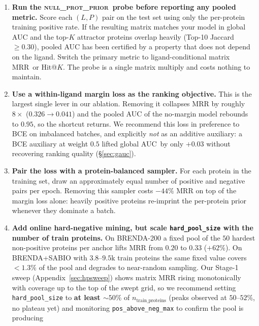 \documentclass[11pt,a4paper]{article}
\newcommand{\nullprior}{\textsc{null\_prot\_prior}\xspace}
\newcommand{\gauc}{global AUC}
\newcommand{\matmrr}{matrix MRR}
\begin{document}
\begin{enumerate}[leftmargin=*,itemsep=2pt,topsep=2pt]
  \item \textbf{Run the \nullprior\ probe before reporting any pooled
        metric.} Score each $(L, P)$ pair on the test set using only
        the per-protein training positive rate. If the resulting
        matrix matches your model in global AUC and the top-$K$
        attractor proteins overlap heavily (Top-10 Jaccard $\ge 0.30$),
        pooled AUC has been certified by a property that does not
        depend on the ligand. Switch the primary metric to
        ligand-conditional \matmrr\ or Hit@$K$. The probe is a single
        matrix multiply and costs nothing to maintain.
  \item \textbf{Use a within-ligand margin loss as the ranking
        objective.} This is the largest single lever in our ablation.
        Removing it collapses MRR by roughly $8\times$
        ($0.326 \to 0.041$) and the pooled AUC of the no-margin model
        rebounds to $0.95$, so the shortcut returns. We recommend this
        loss in preference to BCE on imbalanced batches, and
        explicitly \emph{not} as an additive auxiliary: a BCE
        auxiliary at weight $0.5$ lifted \gauc\ by only $+0.03$
        without recovering ranking quality (\S\ref{sec:gauc}).
  \item \textbf{Pair the loss with a protein-balanced sampler.} For
        each protein in the training set, draw an approximately equal
        number of positive and negative pairs per epoch. Removing this
        sampler costs $-44\%$ MRR on top of the margin loss alone:
        heavily positive proteins re-imprint the per-protein prior
        whenever they dominate a batch.
  \item \textbf{Add online hard-negative mining, but scale
        \texttt{hard\_pool\_size} with the number of train proteins.}
        On BRENDA-200 a fixed pool of the $50$ hardest non-positive
        proteins per anchor lifts MRR from $0.20$ to $0.33$
        ($+62\%$). On BRENDA+SABIO with $3.8$--$9.5$k train proteins
        the same fixed value covers $<\!1.3\%$ of the pool and
        degrades to near-random sampling. Our Stage-1 sweep
        (Appendix~\ref{sec:hpsweep}) shows matrix MRR rising
        monotonically with coverage up to the top of the swept grid, so
        we recommend setting \texttt{hard\_pool\_size} to
        \textbf{at least $\sim\!50\%$} of $n_{\text{train\_proteins}}$
        (peaks observed at $50$--$52\%$, no plateau yet) and monitoring
        \texttt{pos\_above\_neg\_max} to confirm the pool is producing

\end{enumerate}
\end{document}

